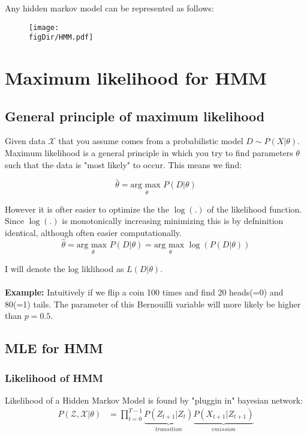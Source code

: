 Any hidden markov model can be represented as follows:
\begin{figure}[h!]
	\centering
	\texttt{[image: \\figDir/HMM.pdf]}
\end{figure}
\section{Maximum likelihood for HMM}
\subsection{General principle of maximum likelihood}
	
Given data $\mathcal{X}$ that you assume comes from a probabilistic model $D \sim P(X|\theta)$. Maximum likelihood is a general principle in which you try to find parameters $\theta$ such that the data is "most likely" to occur. This means we find:

\begin{equation}
	\hat{\theta} = \underset{\theta}{\text{arg max }} P(D|\theta)
\end{equation}

However it is ofter easier to optimize the the $\log(.)$ of the likelihood function. Since $\log(.)$ is monotonically increasing minimizing this is by defninition identical, although often easier computationally.
\begin{equation}
	\hat{\theta} = \underset{\theta}{\text{arg max }} P(D|\theta) = \underset{\theta}{\text{arg max }} \log(P(D|\theta))
\end{equation}
	
I will denote the log liklihood as $L(D|\theta)$.\\\\

\textbf{Example:} Intuitively if we flip a coin 100 times and find 20 heads(=0) and 80(=1) tails. The parameter of this Bernouilli variable will more likely be higher than $p=0.5$.
	
\subsection{MLE for HMM}
\subsubsection{Likelihood of HMM}
Likelihood of a Hidden Markov Model is found by "pluggin in" bayesian network:
\begin{equation}
	\begin{split}
	P(\mathcal{Z},\mathcal{X}|\theta) &= \prod_{t=0}^{T-1}\underbrace{P(Z_{t+1}|Z_t)}_{transition}\underbrace{P(X_{t+1}|Z_{t+1})}_{emission}
	\end{split}
\end{equation}

